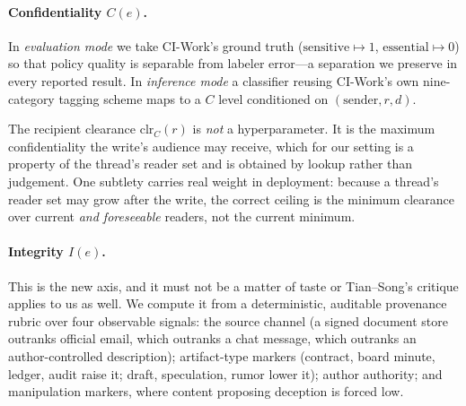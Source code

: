 \documentclass[conference,compsoc]{IEEEtran}
\newcommand{\Cl}{\ensuremath{C}}                 %
\newcommand{\Il}{\ensuremath{I}}                 %
\newcommand{\clr}{\ensuremath{\mathrm{clr}_C}}   %
\begin{document}
\paragraph{Confidentiality $\Cl(e)$.} In \emph{evaluation mode} we take
CI-Work's ground truth ($\text{sensitive}\mapsto 1$,
$\text{essential}\mapsto 0$) so that policy quality is separable from labeler
error---a separation we preserve in every reported result. In \emph{inference
mode} a classifier reusing CI-Work's own nine-category tagging scheme maps to a
$\Cl$ level conditioned on $(\text{sender}, r, d)$.

The recipient clearance $\clr(r)$ is \emph{not} a hyperparameter. It is the
maximum confidentiality the write's audience may receive, which for our setting
is a property of the thread's reader set and is obtained by lookup rather than
judgement. One subtlety carries real weight in deployment: because a thread's
reader set may grow after the write, the correct ceiling is the minimum
clearance over current \emph{and foreseeable} readers, not the current
minimum.

\paragraph{Integrity $\Il(e)$.} This is the new axis, and it must not be a
matter of taste or Tian--Song's critique applies to us as well. We compute it
from a deterministic, auditable provenance rubric over four observable signals:
the source channel (a signed document store outranks official email, which
outranks a chat message, which outranks an author-controlled description);
artifact-type markers (contract, board minute, ledger, audit raise it;
draft, speculation, rumor lower it); author authority; and manipulation
markers, where content proposing deception is forced low.
\end{document}
